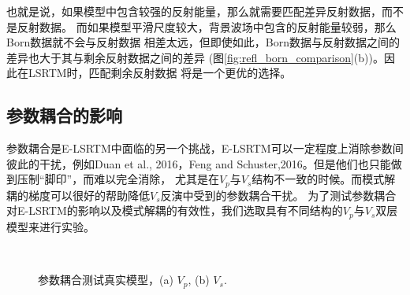 也就是说，如果模型中包含较强的反射能量，那么就需要匹配差异反射数据，而不是反射数据。
而如果模型平滑尺度较大，背景波场中包含的反射能量较弱，那么Born数据就不会与反射数据
相差太远，但即使如此，Born数据与反射数据之间的差异也大于其与剩余反射数据之间的差异
(图\ref{fig:refl_born_comparison}(b))。因此在LSRTM时，匹配剩余反射数据
将是一个更优的选择。
\subsection{参数耦合的影响}
参数耦合是E-LSRTM中面临的另一个挑战，E-LSRTM可以一定程度上消除参数间
彼此的干扰，例如Duan et al., 2016\cite{Duan2016}，Feng and
Schuster,2016\cite{Feng2016}。但是他们也只能做到压制“脚印”，而难以完全消除，
尤其是在$V_p$与$V_s$结构不一致的时候。而模式解耦的梯度可以很好的帮助降低$V_s$反演中受到的参数耦合干扰。
为了测试参数耦合对E-LSRTM的影响以及模式解耦的有效性，我们选取具有不同结构的$V_p$与$V_s$双层模型来进行实验。
\begin{figure}[!htb]
   \centering
   \\
   \caption{参数耦合测试真实模型，(a) $V_p$, (b) $V_s$.}
   \label{fig:tradeoffModel}
\end{figure}
